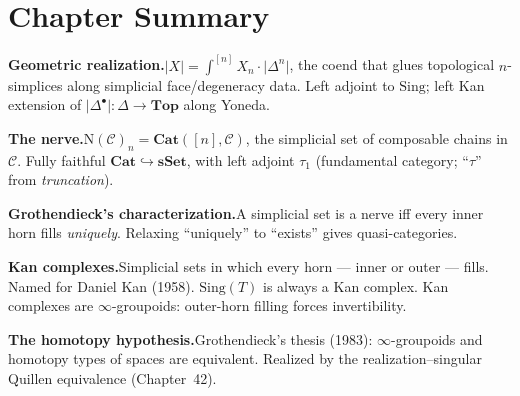 \begin{exercisesbox}
\begin{qa}
\end{qa}
\end{exercisesbox}


\section*{Chapter Summary}

\begin{summarybox}
\textbf{Geometric realization.}\quad $\lvert X\rvert = \int^{[n]} X_n \cdot
\lvert\Delta^n\rvert$, the coend that glues topological $n$-simplices
along simplicial face/degeneracy data. Left adjoint to $\mathrm{Sing}$;
left Kan extension of $\lvert\Delta^\bullet\rvert : \Delta \to \mathbf{Top}$
along Yoneda.

\textbf{The nerve.}\quad $\mathrm{N}(\mathcal{C})_n = \mathbf{Cat}([n], \mathcal{C})$,
the simplicial set of composable chains in $\mathcal{C}$. Fully faithful
$\mathbf{Cat} \hookrightarrow \mathbf{sSet}$, with left adjoint $\tau_1$
(fundamental category; ``$\tau$'' from \emph{truncation}).

\textbf{Grothendieck's characterization.}\quad A simplicial set is a
nerve iff every inner horn fills \emph{uniquely}. Relaxing ``uniquely''
to ``exists'' gives quasi-categories.

\textbf{Kan complexes.}\quad Simplicial sets in which every horn —
inner or outer — fills. Named for Daniel Kan (1958). $\mathrm{Sing}(T)$
is always a Kan complex. Kan complexes are $\infty$-groupoids:
outer-horn filling forces invertibility.

\textbf{The homotopy hypothesis.}\quad Grothendieck's thesis (1983):
$\infty$-groupoids and homotopy types of spaces are equivalent. Realized
by the realization–singular Quillen equivalence (Chapter~42).
\end{summarybox}


